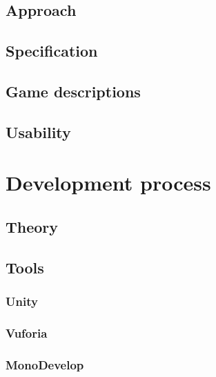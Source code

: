 \documentclass[BSP,english,oneside]{classes/gucthesis}
\begin{document}
	\section{Approach}
		\label{sec:approach}
		

	\section{Specification}
		\label{sec:specification}
		

	\section{Game descriptions}
		\label{sec:game_descriptions}
		

	\section{Usability}
		\label{sec:usability}
		


\chapter{Development process}
	\label{chap:development_process}

	\section{Theory}
		\label{sec:theory}
		

	\section{Tools}
		\label{sec:tools}

		\subsection{Unity}
			\label{subsec:unity}
			

		\subsection{Vuforia}
			\label{subsec:vuforia}
			

		\subsection{MonoDevelop}
			\label{subsec:monodevelop}
			
\end{document}
